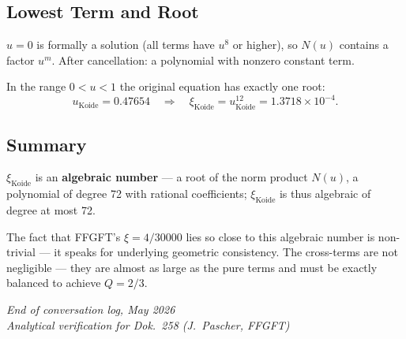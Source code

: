 \subsection{Lowest Term and Root}

$u=0$ is formally a solution (all terms have $u^8$ or higher), so $N(u)$ contains
a factor $u^m$. After cancellation: a polynomial with nonzero constant term.

In the range $0<u<1$ the original equation has exactly one root:
\[
  u_{\text{Koide}}=0.47654
  \quad\Rightarrow\quad
  \xi_{\text{Koide}}=u_{\text{Koide}}^{12}=1.3718\times10^{-4}.
\]

\subsection{Summary}

$\xi_{\text{Koide}}$ is an \textbf{algebraic number} --- a root of the norm
product $N(u)$, a polynomial of degree 72 with rational coefficients;
$\xi_{\text{Koide}}$ is thus algebraic of degree at most 72.

The fact that FFGFT's $\xi=4/30000$ lies so close to this algebraic number is
non-trivial --- it speaks for underlying geometric consistency.
The cross-terms are not negligible --- they are almost as large as the pure terms
and must be exactly balanced to achieve $Q=2/3$.

\bigskip
\begin{flushright}
\textit{End of conversation log, May 2026}\\
\textit{Analytical verification for Dok.~258 (J.~Pascher, FFGFT)}
\end{flushright}
